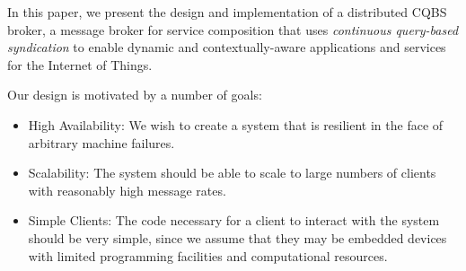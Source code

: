 In this paper, we present the design and implementation of a distributed CQBS broker, a message broker for service composition that uses \emph{continuous query-based syndication} to enable dynamic and contextually-aware applications and services for the Internet of Things.

Our design is motivated by a number of goals:
\begin{itemize}
\item High Availability: We wish to create a system that is resilient in the face of arbitrary machine failures.
\item Scalability: The system should be able to scale to large numbers of clients with reasonably high message rates.
\item Simple Clients: The code necessary for a client to interact with the system should be very simple, since we assume that they may be embedded devices with limited programming facilities and computational resources.
\end{itemize}

